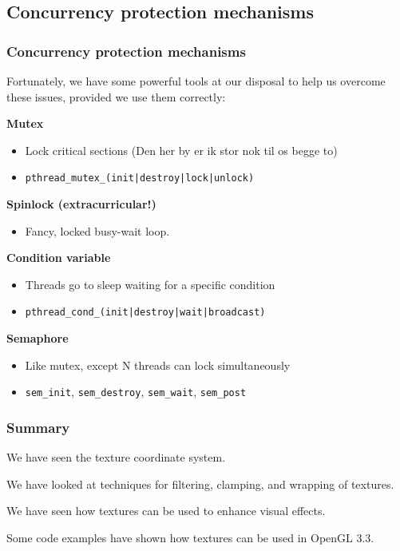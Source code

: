 \documentclass{beamer}
\begin{document}
%
%
%
\begin{frame}
\section{Concurrency protection mechanisms}
\frametitle{Concurrency protection mechanisms}
Fortunately, we have some powerful tools at our disposal to help us
overcome these issues, provided we use them correctly:

\textbf{Mutex}
\begin{itemize}
\item Lock critical sections (\footnotesize{Den her by er ik stor nok til os begge to})
\item \texttt{pthread\_mutex\_(init|destroy|lock|unlock)}
\end{itemize}

\textbf{Spinlock (extracurricular!)}
\begin{itemize}
\item Fancy, locked busy-wait loop.
\end{itemize}

\textbf{Condition variable}
\begin{itemize}
\item Threads go to sleep waiting for a specific condition
\item \texttt{pthread\_cond\_(init|destroy|wait|broadcast)}
\end{itemize}

\textbf{Semaphore}
\begin{itemize}
\item Like mutex, except N threads can lock simultaneously
\item \texttt{sem\_init}, \texttt{sem\_destroy}, \texttt{sem\_wait}, \texttt{sem\_post}
\end{itemize}

\end{frame}



%
%
\begin{frame}
\frametitle{Summary}
We have seen the texture coordinate system.

\vspace{5mm}
We have looked at techniques for filtering, clamping, and wrapping
of textures.

\vspace{5mm}
We have seen how textures can be used to enhance visual effects.

\vspace{5mm}
Some code examples have shown how textures can be used in OpenGL 3.3.
\end{frame}


%
%
%
\end{document}
